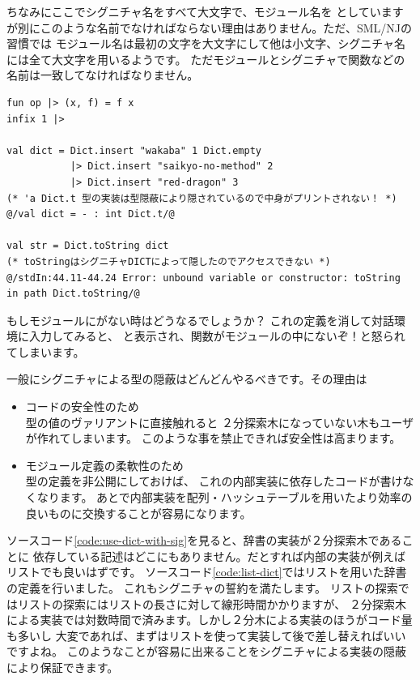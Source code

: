 \documentclass[11pt,a4paper]{jarticle}
\begin{document}
ちなみにここでシグニチャ名をすべて大文字で、モジュール名を
としていますが別にこのような名前でなければならない理由はありません。ただ、SML/NJの習慣では
モジュール名は最初の文字を大文字にして他は小文字、シグニチャ名には全て大文字を用いるようです。
ただモジュールとシグニチャで関数などの名前は一致してなければなりません。

\begin{lstlisting}[caption=\prog{Dict}を使おう,label=code:use-dict-with-sig]
fun op |> (x, f) = f x
infix 1 |>

val dict = Dict.insert "wakaba" 1 Dict.empty
           |> Dict.insert "saikyo-no-method" 2
           |> Dict.insert "red-dragon" 3
(* 'a Dict.t 型の実装は型隠蔽により隠されているので中身がプリントされない！ *)
@/val dict = - : int Dict.t/@

val str = Dict.toString dict
(* toStringはシグニチャDICTによって隠したのでアクセスできない *)
@/stdIn:44.11-44.24 Error: unbound variable or constructor: toString in path Dict.toString/@
\end{lstlisting}

もしモジュールにがない時はどうなるでしょうか？
これの定義を消して対話環境に入力してみると、
と表示され、関数がモジュールの中にないぞ！と怒られてしまいます。

一般にシグニチャによる型の隠蔽はどんどんやるべきです。その理由は
\begin{itemize}
\item コードの安全性のため\\
  型の値のヴァリアントに直接触れると
  ２分探索木になっていない木もユーザが作れてしまいます。
  このような事を禁止できれば安全性は高まります。
\item モジュール定義の柔軟性のため\\
  型の定義を非公開にしておけば、
これの内部実装に依存したコードが書けなくなります。
あとで内部実装を配列・ハッシュテーブルを用いたより効率の良いものに交換することが容易になります。
\end{itemize}

ソースコード\ref{code:use-dict-with-sig}を見ると、辞書の実装が２分探索木であることに
依存している記述はどこにもありません。だとすれば内部の実装が例えばリストでも良いはずです。
ソースコード\ref{code:list-dict}ではリストを用いた辞書の定義を行いました。
これもシグニチャの誓約を満たします。
リストの探索ではリストの探索にはリストの長さに対して線形時間かかりますが、
２分探索木による実装では対数時間で済みます。しかし２分木による実装のほうがコード量も多いし
大変であれば、まずはリストを使って実装して後で差し替えればいいですよね。
このようなことが容易に出来ることをシグニチャによる実装の隠蔽により保証できます。
\end{document}

